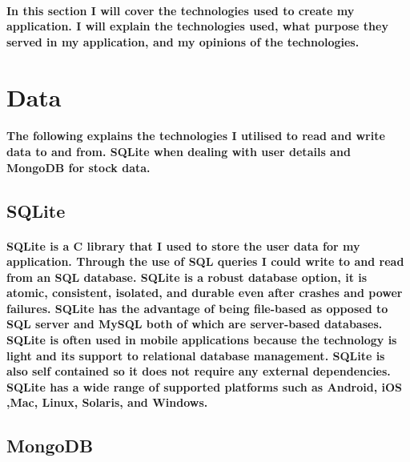 \paragraph{In this section I will cover the technologies used to create my application. I will explain the technologies used, what purpose they served in my application, and my opinions of the technologies.}
\section{Data}
\paragraph{The following explains the technologies I utilised to read and write data to and from. SQLite when dealing with user details and MongoDB for stock data.}

\subsection{SQLite}
\paragraph{SQLite is a C library that I used to store the user data for my application. Through the use of SQL queries I could write to and read from an SQL database. SQLite is a robust database option, it is atomic, consistent, isolated, and durable even after crashes and power failures.\cite{sqlite} SQLite has the advantage of being file-based as opposed to SQL server and MySQL both of which are server-based databases. SQLite is often used in mobile applications because the technology is light and its support to relational database management. SQLite is also self contained so it does not require any external dependencies. SQLite has a wide range of supported platforms such as Android, iOS ,Mac, Linux, Solaris, and Windows.\cite{bhosale2015sqlite} }

\subsection{MongoDB}
